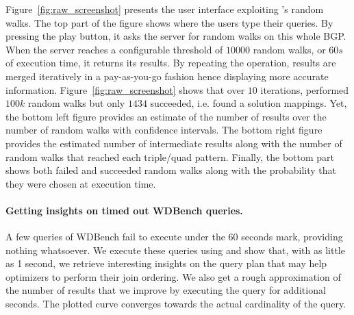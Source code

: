  
Figure~\ref{fig:raw_screenshot} presents the user interface exploiting
\NAME's random walks. The top part of the figure shows where the users
type their queries. By pressing the play button, it asks the server
for random walks on this whole BGP. When the server reaches a
configurable threshold of $10 000$ random walks, or $60s$ of execution
time, it returns its results. By repeating the operation, results are
merged iteratively in a pay-as-you-go fashion hence displaying more
accurate information. Figure~\ref{fig:raw_screenshot} shows that over
$10$ iterations, \NAME performed $100k$ random walks but only $1434$
succeeded, i.e. found a solution mappings. Yet, the bottom left figure provides an estimate
of the number of results over the number of random walks with %
confidence intervals. The bottom right figure provides the estimated
number of intermediate results along with the number of random walks
that reached each triple/quad pattern.  Finally, the bottom part shows
both failed and succeeded random walks along with the probability that
they were chosen at execution time.

\paragraph{Getting insights on timed out WDBench queries.}
A few queries of WDBench fail to execute under the 60 seconds mark,
providing nothing whatsoever. We execute these queries using \NAME and
show that, with as little as 1 second, we retrieve interesting
insights on the query plan that may help optimizers to perform their
join ordering. We also get a rough approximation of the number of
results that we improve by executing the query for additional seconds.
The plotted curve converges towards the actual cardinality of the query.
